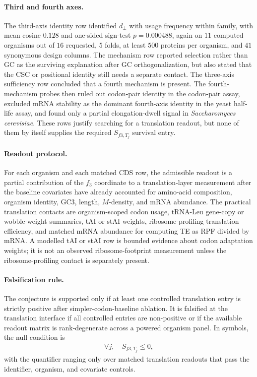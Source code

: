 \paragraph{Third and fourth axes.}
The third-axis identity row identified $d_{\perp}$ with usage frequency within family, with mean cosine $0.128$ and one-sided sign-test $p = 0.000488$, again on $11$ computed organisms out of $16$ requested, $5$ folds, at least $500$ proteins per organism, and $41$ synonymous design columns. The mechanism row reported selection rather than GC as the surviving explanation after GC orthogonalization, but also stated that the CSC or positional identity still needs a separate contact. The three-axis sufficiency row concluded that a fourth mechanism is present. The fourth-mechanism probes then ruled out codon-pair identity in the codon-pair assay, excluded mRNA stability as the dominant fourth-axis identity in the yeast half-life assay, and found only a partial elongation-dwell signal in \emph{Saccharomyces cerevisiae}. These rows justify searching for a translation readout, but none of them by itself supplies the required $S_{f3,T_j}$ survival entry.

\paragraph{Readout protocol.}
For each organism and each matched CDS row, the admissible readout is a partial contribution of the $f_3$ coordinate to a translation-layer measurement after the baseline covariates have already accounted for amino-acid composition, organism identity, GC3, length, $M$-density, and mRNA abundance. The practical translation contacts are organism-scoped codon usage, tRNA-Leu gene-copy or wobble-weight summaries, tAI or stAI weights, ribosome-profiling translation efficiency, and matched mRNA abundance for computing TE as RPF divided by mRNA. A modelled tAI or stAI row is bounded evidence about codon adaptation weights; it is not an observed ribosome-footprint measurement unless the ribosome-profiling contact is separately present.

\paragraph{Falsification rule.}
The conjecture is supported only if at least one controlled translation entry is strictly positive after simpler-codon-baseline ablation. It is falsified at the translation interface if all controlled entries are non-positive or if the available readout matrix is rank-degenerate across a powered organism panel. In symbols, the null condition is
$$
\begin{aligned}
\forall j,\quad S_{f3,T_j} \leq 0,
\end{aligned}
$$
with the quantifier ranging only over matched translation readouts that pass the identifier, organism, and covariate controls.

